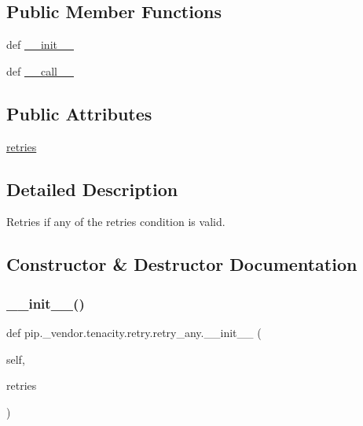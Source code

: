 \subsection*{Public Member Functions}
\begin{DoxyCompactItemize}
\item 
def \hyperlink{classpip_1_1__vendor_1_1tenacity_1_1retry_1_1retry__any_aeaa6594a01ea18c5aa6a127e831ea066}{\+\_\+\+\_\+init\+\_\+\+\_\+}
\item 
def \hyperlink{classpip_1_1__vendor_1_1tenacity_1_1retry_1_1retry__any_af9c227fa6faff4744304424b1fa87f57}{\+\_\+\+\_\+call\+\_\+\+\_\+}
\end{DoxyCompactItemize}
\subsection*{Public Attributes}
\begin{DoxyCompactItemize}
\item 
\hyperlink{classpip_1_1__vendor_1_1tenacity_1_1retry_1_1retry__any_a3570f8d69553ca38dbac23846584ea78}{retries}
\end{DoxyCompactItemize}


\subsection{Detailed Description}
\begin{DoxyVerb}Retries if any of the retries condition is valid.\end{DoxyVerb}
 

\subsection{Constructor \& Destructor Documentation}
\mbox{\label{classpip_1_1__vendor_1_1tenacity_1_1retry_1_1retry__any_aeaa6594a01ea18c5aa6a127e831ea066}} 
\subsubsection{\texorpdfstring{\+\_\+\+\_\+init\+\_\+\+\_\+()}{\_\_init\_\_()}}
{\footnotesize\ttfamily def pip.\+\_\+vendor.\+tenacity.\+retry.\+retry\+\_\+any.\+\_\+\+\_\+init\+\_\+\+\_\+ (\begin{DoxyParamCaption}\item[{}]{self,  }\item[{}]{retries }\end{DoxyParamCaption})}



